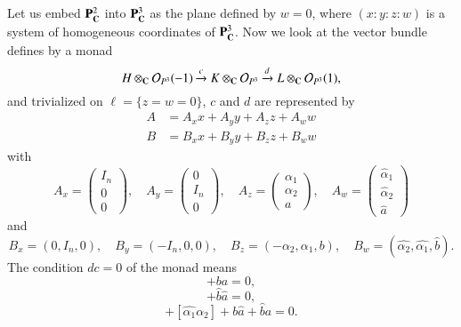 Let us embed $\mathbf{P}_{\mathbf{C}}^{2}$ into $\mathbf{P}_{\mathbf{C}}^{3}$ as the plane defined by $w =0$, where $(x : y : z : w)$ is a system of homogeneous coordinates of $\mathbf{P}_{\mathbf{C}}^{3}$. Now we look at the vector bundle defines by a monad
$$
H \otimes_{\mathbf{C}} \mathcal{O}_{P^{3}}(-1) \xrightarrow{c} K \otimes_{\mathbf{C}}\mathcal{O}_{P^{3}} \xrightarrow{d} L \otimes_{\mathbf{C}}\mathcal{O}_{P^{3}}(1),
$$
and trivialized on $\ell =\{z=w=0\}$, $c$ and $d$ are represented by
\begin{align*}
A &= A_{x}x + A_{y}y + A_{z}z + A_{w}w\\
B &=B_{x}x + B_{y}y +B_{z}z+B_{w}w
\end{align*}
with
$$
A_{x} = \begin{pmatrix}
I_{n}\\
0\\
0
\end{pmatrix}
,\quad A_{y}=
\begin{pmatrix}
0\\
I_{n}\\
0
\end{pmatrix}
,\quad A_{z}=
\begin{pmatrix}
\alpha_{1}\\
\alpha_{2}\\
a
\end{pmatrix}
,\quad A_{w} =
\begin{pmatrix}
\hat{\alpha}_{1}\\
\hat{\alpha}_{2}\\
\hat{a}
\end{pmatrix}
$$
and
$$
B_{x}= (0,I_{n}, 0), \quad B_{y}=(-I_{n}, 0,0), \quad B_{z} =(-\alpha_{2}, \alpha_{1}, b), \quad B_{w} =(\hat{\alpha_{2}}, \hat{\alpha_{1}}, \hat{b}).
$$
The condition $dc =0$ of the monad means
\begin{equation*}
[\alpha_{1}, \alpha_{2}] +ba = 0,\tag{1.4.1}\label{art12-eq-1.4.1}
\end{equation*}
\begin{equation*}
[\hat{\alpha_{1}}, \hat{\alpha_{2}}] +\hat{b}\hat{a} = 0,\tag{1.4.2}\label{art12-eq-1.4.2}
\end{equation*}
\begin{equation*}
[\alpha_{1}, \hat{\alpha_{2}}] +[\hat{\alpha_{1}}\alpha_{2}] + b \hat{a}+ \hat{b}a = 0.\tag{1.4.3}\label{art12-eq-1.4.3}
\end{equation*}\pageoriginale

